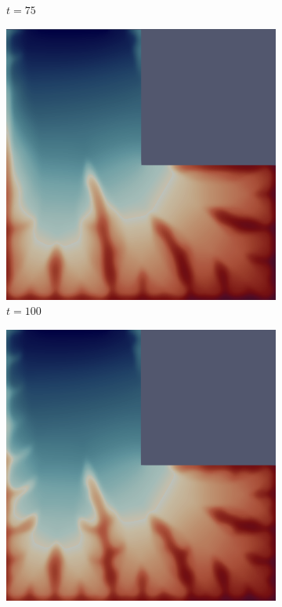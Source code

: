 \begin{figure}[H]
\begin{subfigure}{.4\textwidth}
        \caption{$t = 75$}
    \end{subfigure}
    \begin{subfigure}{.4\textwidth}
        \includegraphics[width=\textwidth]{imgs/LShape_Solution/fifth.png}
        \caption{$t = 100$}
    \end{subfigure}
    \begin{subfigure}{.4\textwidth}
        \includegraphics[width=\textwidth]{imgs/LShape_Solution/sixth.png}

\end{subfigure}
\end{figure}
